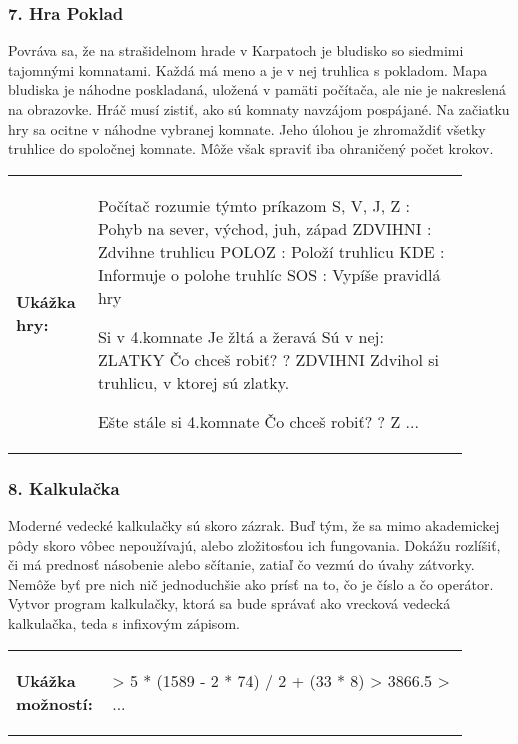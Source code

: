 \subsubsection*{7. Hra Poklad}
Povráva sa, že na strašidelnom hrade v Karpatoch je bludisko so siedmimi tajomnými komnatami. Každá má meno a je v nej truhlica s pokladom. Mapa bludiska je náhodne poskladaná, uložená v pamäti počítača, ale nie je nakreslená na obrazovke. Hráč musí zistiť, ako sú komnaty navzájom pospájané. Na začiatku hry sa ocitne v náhodne vybranej komnate. Jeho úlohou je zhromaždiť všetky truhlice do spoločnej komnate. Môže však spraviť iba ohraničený počet krokov.

\begin{tabular}{@{}p{0.15\linewidth}p{0.75\linewidth}}
\textbf{\small Ukážka hry:} &
\vspace{-3em}
\begin{code}
Počítač rozumie týmto príkazom
S, V, J, Z   : Pohyb na sever, východ, juh, západ
ZDVIHNI		 : Zdvihne truhlicu
POLOZ		 : Položí truhlicu
KDE			 : Informuje o polohe truhlíc
SOS			 : Vypíše pravidlá hry

Si v 4.komnate
Je žltá a žeravá
Sú v nej: ZLATKY
Čo chceš robiť?
? ZDVIHNI
Zdvihol si truhlicu, v ktorej sú zlatky.

Ešte stále si 4.komnate
Čo chceš robiť?
? Z
...
\end{code}
\end{tabular}
\vspace{-2em}

\subsubsection*{8. Kalkulačka}
Moderné vedecké kalkulačky sú skoro zázrak. Buď tým, že sa mimo akademickej pôdy skoro vôbec nepoužívajú, alebo zložitosťou ich fungovania. Dokážu rozlíšiť, či má prednosť násobenie alebo sčítanie, zatiaľ čo vezmú do úvahy zátvorky. Nemôže byť pre nich nič jednoduchšie ako prísť na to, čo je číslo a čo operátor. Vytvor program kalkulačky, ktorá sa bude správať ako vrecková vedecká kalkulačka, teda s infixovým zápisom.

\begin{tabular}{@{}p{0.15\linewidth}p{0.75\linewidth}}
\textbf{\small Ukážka možností:} &
\vspace{-3em}
\begin{code}
> 5 * (1589 - 2 * 74) / 2 + (33 * 8)
> 3866.5
> ...
\end{code}
\end{tabular}
\vspace{-2em}
